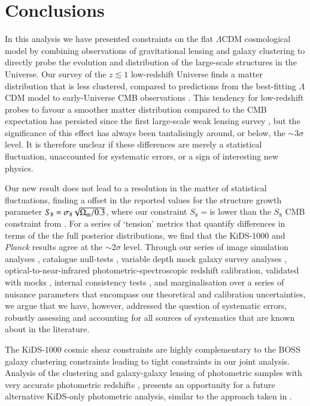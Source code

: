 \section{Conclusions}
\label{sec:conc}
In this analysis we have presented constraints on the flat $\Lambda$CDM cosmological model by combining observations of gravitational lensing and galaxy clustering to directly probe the evolution and distribution of the large-scale structures in the Universe.    Our survey of the $z \lesssim 1$ low-redshift Universe finds a matter distribution that is less clustered, compared to predictions from the best-fitting $\Lambda$CDM model to early-Universe CMB observations \citep{planck/etal:2018}.  This tendency for low-redshift probes to favour a smoother matter distribution compared to the CMB expectation has persisted since the first large-scale weak lensing survey \citep[CFHTLenS,][]{heymans/etal:2013}, but the significance of this effect has always been tantalisingly around, or below, the $\sim 3\sigma$ level.   It is therefore unclear if these differences are merely a statistical fluctuation, unaccounted for systematic errors, or a sign of interesting new physics.

Our new result does not lead to a resolution in the matter of statistical fluctuations, finding a \kpoff offset in the reported values for the structure growth parameter $S_8 = \sigma_8 \sqrt{\Omega_{\rm m}/0.3}$, where our constraint $S_8=$\kSeightval is \kpoffperc lower than the $S_8$ CMB constraint from \citet{planck/etal:2018}.   For a series of `tension' metrics that quantify differences in terms of the the full posterior distributions, we find that the KiDS-1000 and {\it Planck} results agree at the $\sim 2 \sigma$ level.   Through our series of image simulation analyses \citep{kannawadi/etal:2019}, catalogue null-tests \citep{giblin/etal:inprep}, variable depth mock galaxy survey analyses \citep{joachimi/etal:inprep}, optical-to-near-infrared photometric-spectroscopic redshift calibration, validated with mocks \citep{wright/etal:2020, vandenbusch/etal:2020,hildebrandt/etal:inprep}, internal consistency tests \citep{asgari/etal:inprep}, and marginalisation over a series of nuisance parameters that encompass our theoretical and calibration uncertainties,  we argue that we have, however, addressed the question of systematic errors, robustly assessing and accounting for all sources of systematics that are known about in the literature.    

The KiDS-1000 cosmic shear constraints are highly complementary to the BOSS galaxy clustering constraints leading to tight constraints in our joint \tttp analysis.   Analysis of the clustering and galaxy-galaxy lensing of photometric samples with very accurate photometric redshifts \citep[see for example][]{vakili/etal:2019}, presents an opportunity for a future alternative KiDS-only \tttp photometric analysis, similar to the approach taken in \citet{abbott/etal:2018}.


